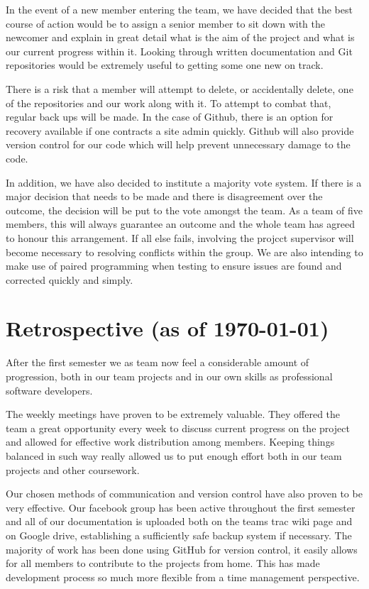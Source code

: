 \documentclass[11pt]{article}
\begin{document}
In the event of a new member entering the team, we have decided that 
the best course of action would be to assign a senior member to sit 
down with the newcomer and explain in great detail what is the aim of 
the project and what is our current progress within it. Looking 
through written documentation and Git repositories would be extremely 
useful to getting some one new on track.

There is a risk that a member will attempt to delete, or accidentally 
delete, one of the repositories and our work along with it. To attempt 
to combat that, regular back ups will be made. In the case of Github, 
there is an option for recovery available if one contracts a site admin 
quickly. Github will also provide version control for our code which 
will help prevent unnecessary damage to the code.

In addition, we have also decided to institute a majority vote system. 
If there is a major decision that needs to be made and there is 
disagreement over the outcome, the decision will be put to the vote 
amongst the team. As a team of five members, this will always guarantee 
an outcome and the whole team has agreed to honour this arrangement. 
If all else fails, involving the projcct supervisor will become necessary 
to resolving conflicts within the group. We are also intending to make 
use of paired programming when testing to ensure issues are found and 
corrected quickly and simply.

\section{Retrospective (as of \today)}

After the first semester we as team now feel a considerable amount of 
progression, both in our team projects and in our own skills as 
professional software developers. 

The weekly meetings have proven to be extremely valuable. They offered 
the team a great opportunity every week to discuss current progress on 
the project and allowed for effective work distribution among members. 
Keeping things balanced in such way really allowed us to put enough 
effort both in our team projects and other coursework.

Our chosen methods of communication and version control have also 
proven to be very effective. Our facebook group has been active 
throughout the first semester and all of our documentation is uploaded 
both on the teams trac wiki page and on Google drive, establishing a 
sufficiently safe backup system if necessary. The majority of work has 
been done using GitHub for version control, it easily allows for all 
members to contribute to the projects from home. This has  made 
development process so much more flexible from a time management 
perspective. 
\end{document}
